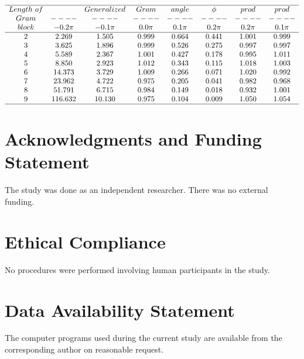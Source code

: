 \documentclass[twoside]{article}
\begin{document}
\begin{table}
\centering \(\begin{array}{cccccccc}
\hline
Length~of  && Generalized &Gram&angle &\phi  &prod &prod\\
Gram     &----&----&----&----&----&----&----\\
block  & -0.2\pi & -0.1\pi & 0.0\pi & 0.1\pi & 0.2\pi &0.2\pi &0.1\pi \\
\hline
2 &2.269 &1.505 &0.999 &0.664 &0.441 &1.001 &0.999\\
3 &3.625 &1.896 &0.999 &0.526 &0.275 &0.997 &0.997\\
4 &5.589 &2.367 &1.001 &0.427 &0.178 &0.995 &1.011\\
5 &8.850 &2.923 &1.012 &0.343 &0.115 &1.018 &1.003\\
6 &14.373 &3.729 &1.009 &0.266 &0.071 &1.020 &0.992\\
7 &23.962 &4.722 &0.975 &0.205 &0.041 &0.982 &0.968\\
8 &51.791 &6.715 &0.984 &0.149 &0.018 &0.932 &1.001\\
9 &116.632 &10.130 &0.975 &0.104 &0.009 &1.050 &1.054\\
\hline
\end{array}\)
\caption{Sharp transition in $Type~II/Type~I$ Gram block ratio.
Notice that the product of the values at plus and minus $\phi$ are approximately $1$.
The statistics are from $10$ million Gram intervals at $t=10^{28}$.}
\label{tab:ratioE28}
\end{table}


\section*{Acknowledgments and Funding Statement}

 The study was done as an independent researcher. There was no
external funding.

\section*{Ethical Compliance}

 No procedures were performed  involving human participants in the study.

\section*{Data Availability Statement}

The computer programs used during the current study are
available from the corresponding author on reasonable request.
\end{document}
